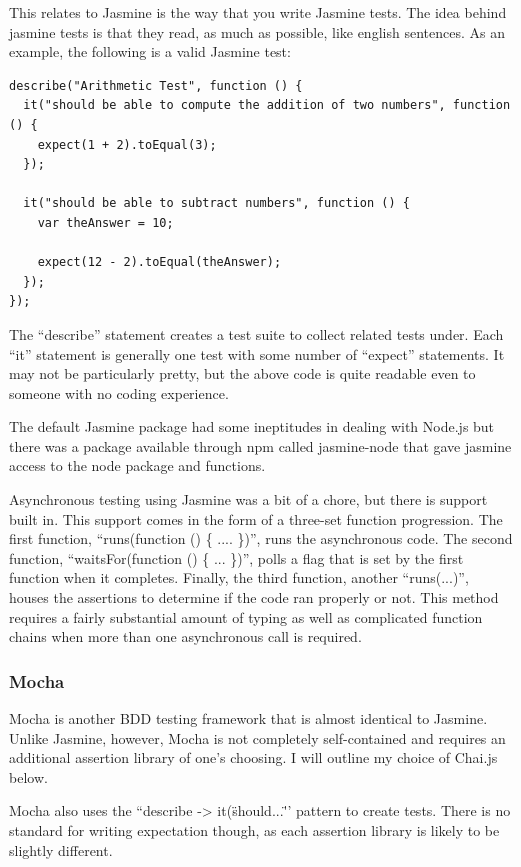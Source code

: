 \documentclass[11pt]{article}
\begin{document}
This relates to Jasmine is the way that you write Jasmine tests. The idea behind jasmine tests is that they read, as much as possible, like english sentences. As an example, the following is a valid Jasmine test:
\begin{lstlisting}
describe("Arithmetic Test", function () {
  it("should be able to compute the addition of two numbers", function () {
    expect(1 + 2).toEqual(3);
  });

  it("should be able to subtract numbers", function () {
    var theAnswer = 10;

    expect(12 - 2).toEqual(theAnswer);
  });
});
\end{lstlisting}
The ``describe'' statement creates a test suite to collect related tests under. Each ``it'' statement is generally one test with some number of ``expect'' statements. It may not be particularly pretty, but the above code is quite readable even to someone with no coding experience.

The default Jasmine package had some ineptitudes in dealing with Node.js but there was a package available through npm called jasmine-node \cite{JasmineNode} that gave jasmine access to the node package and functions. 

Asynchronous testing using Jasmine was a bit of a chore, but there is support built in. This support comes in the form of a three-set function progression. The first function, ``runs(function () \{ .... \})'', runs the asynchronous code. The second function, ``waitsFor(function () \{ ... \})'', polls a flag that is set by the first function when it completes. Finally, the third function, another ``runs(...)'', houses the assertions to determine if the code ran properly or not. This method requires a fairly substantial amount of typing as well as complicated function chains when more than one asynchronous call is required.

\subsubsection{Mocha \cite{Mocha}}
Mocha is another BDD testing framework that is almost identical to Jasmine. Unlike Jasmine, however, Mocha is not completely self-contained and requires an additional assertion library of one's choosing. I will outline my choice of Chai.js below.

Mocha also uses the ``describe -> it(\"should...\" '' pattern to create tests. There is no standard for writing expectation though, as each assertion library is likely to be slightly different.
\end{document}
